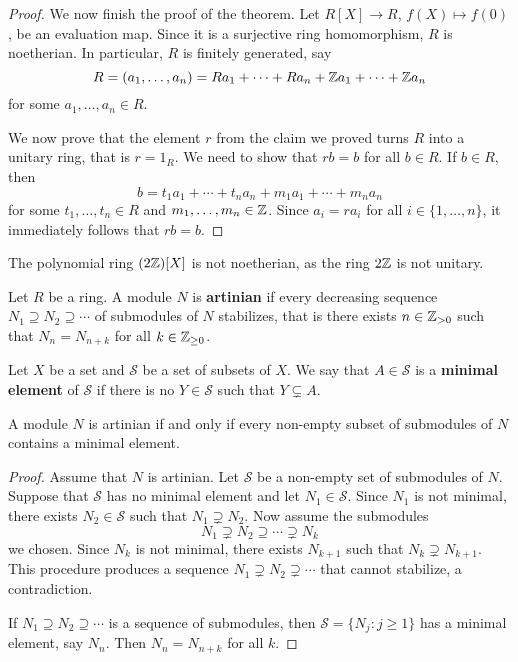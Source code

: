 \begin{proof}
    We now finish the proof of the theorem. 
    Let $R[X]\to R$, $f(X)\mapsto f(0)$, be an evaluation map. Since
    it is a surjective ring homomorphism, 
    $R$ is noetherian. In particular, $R$ is finitely generated, 
    say 
    \[
    R=(a_1,\dots,a_n)=Ra_1+\cdots+Ra_n+\mathbb{Z} a_1+\cdots+\mathbb{Z} a_n
    \]
    for some $a_1,\dots,a_n\in R$. 
    
    We now prove that the element $r$ from the claim we proved turns 
    $R$ into a unitary ring, that is $r=1_R$.  
    We need to show that $rb=b$ for all $b\in R$. 
    If $b\in R$, then 
    \[
    b=t_1a_1+\cdots+t_na_n+m_1a_1+\cdots+m_na_n
    \]
    for some $t_1,\dots,t_n\in R$ and $m_1,\dots,m_n\in\mathbb{Z}$. 
    Since $a_i=ra_i$ for all $i\in\{1,\dots,n\}$, it immediately
    follows that
    $rb=b$. 
\end{proof}

\begin{example}
    The polynomial ring $(2\mathbb{Z})[X]$ is not 
    noetherian, as the ring $2\mathbb{Z}$ is not unitary. 
\end{example}


\begin{definition}
	Let $R$ be a ring. A module $N$ is \textbf{artinian} if every decreasing sequence 
	$N_1\supseteq N_2\supseteq\cdots$ of submodules of $N$ stabilizes, that is
	there exists $n\in\mathbb{Z}_{>0}$ such that 
	$N_n=N_{n+k}$ for all $k\in\mathbb{Z}_{\geq0}$.
\end{definition}

Let $X$ be a set and $\mathcal{S}$ be a set of subsets of $X$. 
We say that $A\in\mathcal{S}$ is a \textbf{minimal element} of $\mathcal{S}$
if there is no $Y\in\mathcal{S}$ such that $Y\subsetneq A$. 

\begin{proposition}
\label{pro:artinian_minimal}
	A module $N$ is artinian if and only if 
	every non-empty subset of submodules of $N$ 
	contains a minimal element. 
\end{proposition}

\begin{proof}
	Assume that $N$ is artinian. Let $\mathcal{S}$ be a non-empty set of submodules of $N$. 
	Suppose that $\mathcal{S}$ has no minimal element and let $N_1\in\mathcal{S}$. 
	Since $N_1$ is not minimal, there exists 
	$N_2\in\mathcal{S}$ such that $N_1\supsetneq N_2$. Now assume the 
	submodules 
	\[
	N_1\supsetneq N_2\supseteq\cdots\supsetneq N_k
	\]
	we chosen. 
	Since $N_k$ is not minimal, there exists $N_{k+1}$ such that $N_k\supsetneq N_{k+1}$.
	This procedure produces a sequence $N_1\supsetneq
	N_2\supsetneq\cdots$ that cannot stabilize, a contradiction. 
	
	If $N_1\supseteq N_2\supseteq\cdots$ is a sequence of submodules, then 
	$\mathcal{S}=\{N_j:j\geq1\}$ has a minimal element, say $N_n$. Then
	$N_n=N_{n+k}$ for all $k$. 
\end{proof}

